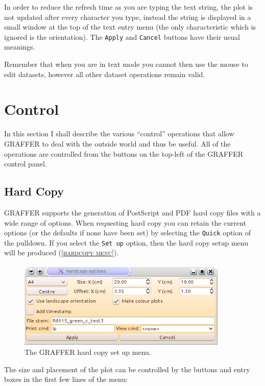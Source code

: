 \documentclass[11pt,twoside,english]{article}
\begin{document}
In order to reduce the refresh time as you are typing the text string,
the plot is not updated after every character you type, instead the
string is displayed in a small window at the top of the text entry menu
(the only characteristic which is ignored is the orientation).  The
\texttt{Apply} and \texttt{Cancel} buttons have their usual meanings.

Remember that when you are in text mode you cannot then use the mouse
to edit datasets, however all other dataset operations remain valid.


\section{Control}

In this section I shall describe the various {}``control'' operations
that allow GRAFFER to deal with the outside world and thus be useful.
All of the operations are controlled from the buttons on the top-left
of the GRAFFER control panel.


\subsection{Hard Copy}

GRAFFER supports the generation of PostScript and PDF hard copy files with a
wide range of options. When requesting hard copy you can retain the
current options (or the defaults if none have been set) by selecting
the \texttt{Quick} option of the pulldown. If you select the
\texttt{Set up} option, then the hard copy setup menu will be produced
(\textsc{\autoref{hardcopy menu}}).

 \begin{figure}[htbp]
   \centering
   \includegraphics[width=10cm]{hardopts}
   \caption{The GRAFFER hard copy set up menu.}
   \label{hardcopy menu}
 \end{figure}
 The size and placement of the plot can be controlled by the buttons
 and entry boxes in the first few lines of the menu:
\end{document}
